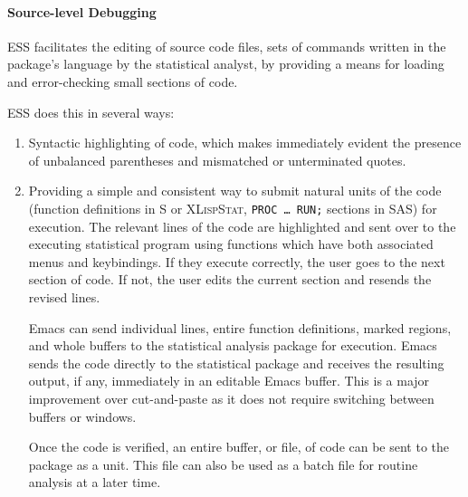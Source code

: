 \documentclass{article}
\newcommand*{\SAS}{\textsc{SAS}}
\newcommand*{\XLispStat}{\textsc{XLispStat}}
\newcommand{\stexttt}[1]{{\small\texttt{#1}}}
\begin{document}
\paragraph{Source-level Debugging}%

ESS facilitates the editing of source code files, sets of commands
written in the package's language by the statistical analyst, by
providing a means for loading and error-checking small sections of
code.  %

ESS does this in several ways:%
\begin{enumerate}
\item %
  Syntactic highlighting of code, which makes immediately evident the
  presence of unbalanced parentheses and mismatched or unterminated
  quotes.%

\item %
  Providing a simple and consistent way to submit natural units of the
  code (function definitions in S or \XLispStat, \stexttt{PROC \dots
    RUN;} sections in \SAS) for execution.  The relevant lines of the
  code are highlighted and sent over to the executing statistical
  program using functions which have both associated menus and keybindings.
  If they execute correctly, the user goes to the next
  section of code.  If not, the user edits the current section and
  resends the revised lines.
  
  Emacs can send individual lines, entire function definitions, marked
  regions, and whole buffers to the statistical analysis package for
  execution.  Emacs sends the code directly to the statistical package
  and receives the resulting output, if any, immediately in an
  editable Emacs buffer.  This is a major improvement over
  cut-and-paste as it does not require switching between buffers or
  windows.
  
  Once the code is verified, an entire buffer, or file, of code can be
  sent to the package as a unit.  This file can also be used as a
  batch file for routine analysis at a later time.


\end{enumerate}
\end{document}
